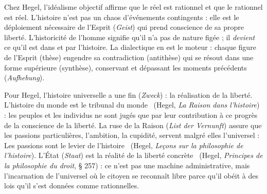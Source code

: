 \documentclass[11pt]{article}
\newcommand{\cle}[1]{{\popxbold\color{popdark}#1}}
\begin{document}
\begin{definition}
Chez Hegel, l'\cle{idéalisme objectif} affirme que le réel est rationnel et que le rationnel est réel. L'histoire n'est pas un chaos d'événements contingents : elle est le déploiement nécessaire de l'\cle{Esprit} (\emph{Geist}) qui prend conscience de sa propre liberté. L'\cle{historicité} de l'homme signifie qu'il n'a pas de nature figée ; il \emph{devient} ce qu'il est dans et par l'histoire. La \cle{dialectique} en est le moteur : chaque figure de l'Esprit (thèse) engendre sa contradiction (antithèse) qui se résout dans une forme supérieure (synthèse), conservant et dépassant les moments précédents (\emph{Aufhebung}).
\end{definition}

\begin{propriete}
Pour Hegel, l'histoire universelle a une \cle{fin} (\emph{Zweck}) : la réalisation de la liberté. \guillemotleft L'histoire du monde est le tribunal du monde \guillemotright\ (Hegel, \emph{La Raison dans l'histoire}) : les peuples et les individus ne sont jugés que par leur contribution à ce progrès de la conscience de la liberté. La \cle{ruse de la Raison} (\emph{List der Vernunft}) assure que les passions particulières, l'ambition, la cupidité, servent malgré elles l'universel : \guillemotleft Les passions sont le levier de l'histoire \guillemotright\ (Hegel, \emph{Leçons sur la philosophie de l'histoire}). L'\cle{État} (\emph{Staat}) est la \guillemotleft réalité de la liberté concrète \guillemotright\ (Hegel, \emph{Principes de la philosophie du droit}, § 257) : ce n'est pas une machine administrative, mais l'incarnation de l'universel où le citoyen se reconnaît libre parce qu'il obéit à des lois qu'il s'est données comme rationnelles.
\end{propriete}
\end{document}
